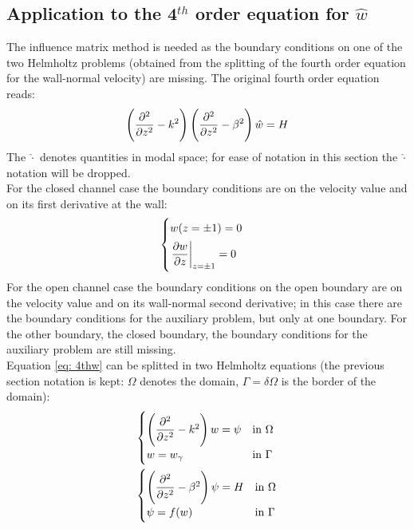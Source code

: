 \subsection{Application to the 4$^{th}$ order equation for $\hat w$}
\label{sec: inf_mat_w}
The influence matrix method is needed as the boundary conditions on one of the two Helmholtz problems (obtained from the splitting of the fourth order equation for the wall-normal velocity) are missing. The original fourth order equation reads: 
\begin{equation}
\left(\frac{\partial^2}{\partial z^2}-k^2\right)\left(\frac{\partial^2}{\partial z^2}-\beta^2\right)\hat w= H
\label{eq: 4thw}
\end{equation}
The $\hat \cdot$ denotes quantities in modal space; for ease of notation in this section the $\hat \cdot$ notation will be dropped.\\
For the closed channel case the boundary conditions are on the velocity value and on its first derivative at the wall:
\begin{equation}
\begin{cases}
w(z=\pm1)=0 \\[1ex]
\left.\dfrac{\partial w}{\partial z}\right|_{z=\pm1}=0\\
\end{cases}
\end{equation}
For the open channel case the boundary conditions on the open boundary are on the velocity value and on its wall-normal second derivative; in this case there are the boundary conditions for the auxiliary problem, but only at one boundary. For the other boundary, the closed boundary, the boundary conditions for the auxiliary problem are still missing.\\
Equation \ref{eq: 4thw} can be splitted in two Helmholtz equations (the previous section notation is kept: $\Omega$ denotes the domain, $\Gamma=\delta\Omega$ is the border of the domain):
\begin{equation}
\begin{array}{l}
\begin{cases}
\left( \dfrac{\partial^2}{\partial z^2}-k^2\right) w=\psi  & \textnormal{in }\Omega \\
w=w_\gamma & \textnormal{in } \Gamma
\end{cases}
\\[5ex] 
\begin{cases}
\left( \dfrac{\partial^2}{\partial z^2}-\beta^2 \right) \psi=H & \textnormal{in }\Omega \\
\psi=f(w) & \textnormal{in } \Gamma
\end{cases}
\end{array}
\end{equation}
